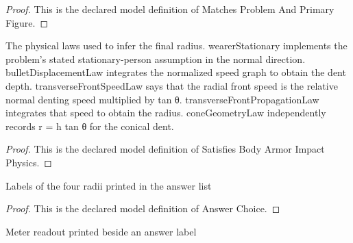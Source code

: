 \begin{proof}
  This is the declared model definition of Matches Problem And Primary Figure.
\end{proof}
\begin{definition}
  \label{def:physics:phyx-mini-0304:phyxminiproblems-problemphyxmini0304-satisfiesbodyarmorimpactphysics}
  The physical laws used to infer the final radius. wearerStationary implements the problem's stated stationary-person assumption in the normal direction. bulletDisplacementLaw integrates the normalized speed graph to obtain the dent depth. transverseFrontSpeedLaw says that the radial front speed is the relative normal denting speed multiplied by tan θ. transverseFrontPropagationLaw integrates that speed to obtain the radius. coneGeometryLaw independently records r = h tan θ for the conical dent.
\end{definition}
\begin{proof}
  This is the declared model definition of Satisfies Body Armor Impact Physics.
\end{proof}
\begin{definition}
  \label{def:physics:phyx-mini-0304:phyxminiproblems-problemphyxmini0304-answerchoice}
  Labels of the four radii printed in the answer list
\end{definition}
\begin{proof}
  This is the declared model definition of Answer Choice.
\end{proof}
\begin{definition}
  \label{def:physics:phyx-mini-0304:phyxminiproblems-problemphyxmini0304-answerchoice-radiusinmeters}
  Meter readout printed beside an answer label
\end{definition}
